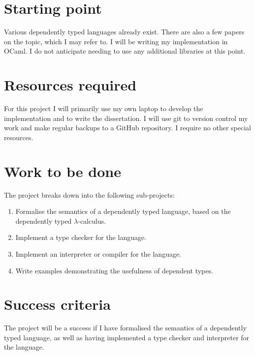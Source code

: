 \documentclass[12pt,a4paper,twoside]{article}
\begin{document}
\section*{Starting point}

Various dependently typed languages already exist.
There are also a few papers on the topic, which I may refer to.
I will be writing my implementation in OCaml.
I do not anticipate needing to use any additional libraries at this point.

\section*{Resources required}

For this project I will primarily use my own laptop to develop the implementation and to write the dissertation.
I will use git to version control my work and make regular backups to a GitHub repository.
I require no other special resources.

\section*{Work to be done}

The project breaks down into the following sub-projects:

\begin{enumerate}

\item Formalise the semantics of a dependently typed language, based on the dependently typed \(\lambda\)-calculus.

\item Implement a type checker for the language.

\item Implement an interpreter or compiler for the language.

\item Write examples demonstrating the usefulness of dependent types.

\end{enumerate}

\section*{Success criteria}

The project will be a success if I have formalised the semantics of a dependently typed language, as well as having implemented a type checker and interpreter for the language.
\end{document}
